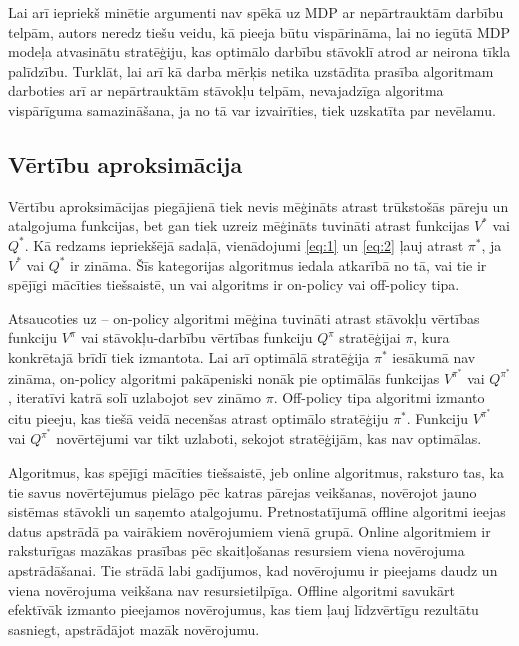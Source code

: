 \documentclass{ludis} %
\begin{document}

Lai arī iepriekš minētie argumenti nav spēkā uz MDP ar nepārtrauktām darbību telpām, autors neredz tiešu veidu, kā pieeja būtu vispārināma, lai no iegūtā MDP modeļa atvasinātu stratēģiju, kas optimālo darbību stāvoklī atrod ar neirona tīkla palīdzību.
Turklāt, lai arī kā darba mērķis netika uzstādīta prasība algoritmam darboties arī ar nepārtrauktām stāvokļu telpām, nevajadzīga algoritma vispārīguma samazināšana, ja no tā var izvairīties, tiek uzskatīta par nevēlamu.

\subsection{Vērtību aproksimācija}
Vērtību aproksimācijas piegājienā tiek nevis mēģināts atrast trūkstošās pāreju un atalgojuma funkcijas, bet gan tiek uzreiz mēģināts tuvināti atrast funkcijas $V^*$ vai $Q^*$.
Kā redzams iepriekšējā sadaļā, vienādojumi \eqref{eq:1} un \eqref{eq:2} ļauj atrast $\pi^*$, ja $V^*$ vai $Q^*$ ir zināma.
Šīs kategorijas algoritmus iedala atkarībā no tā, vai tie ir spējīgi mācīties tiešsaistē, un vai algoritms ir on-policy vai off-policy tipa.

Atsaucoties uz \autocite{Hasselt2012} -- on-policy algoritmi mēģina tuvināti atrast stāvokļu vērtības funkciju $V^\pi$ vai stāvokļu-darbību vērtības funkciju $Q^\pi$ stratēģijai $\pi$, kura konkrētajā brīdī tiek izmantota.
Lai arī optimālā stratēģija $\pi^*$ iesākumā nav zināma, on-policy algoritmi pakāpeniski nonāk pie optimālās funkcijas $V^{\pi^*}$ vai $Q^{\pi^*}$, iteratīvi katrā solī uzlabojot sev zināmo $\pi$.
Off-policy tipa algoritmi izmanto citu pieeju, kas tiešā veidā necenšas atrast optimālo stratēģiju $\pi^*$.
Funkciju $V^{\pi^*}$ vai $Q^{\pi^*}$ novērtējumi var tikt uzlaboti, sekojot stratēģijām, kas nav optimālas.

Algoritmus, kas spējīgi mācīties tiešsaistē, jeb online algoritmus, raksturo tas, ka tie savus novērtējumus pielāgo pēc katras pārejas veikšanas, novērojot jauno sistēmas stāvokli un saņemto atalgojumu.
Pretnostatījumā offline algoritmi ieejas datus apstrādā pa vairākiem novērojumiem vienā grupā.
Online algoritmiem ir raksturīgas mazākas prasības pēc skaitļošanas resursiem viena novērojuma apstrādāšanai. Tie strādā labi gadījumos, kad novērojumu ir pieejams daudz un viena novērojuma veikšana nav resursietilpīga.
Offline algoritmi savukārt efektīvāk izmanto pieejamos novērojumus, kas tiem ļauj līdzvērtīgu rezultātu sasniegt, apstrādājot mazāk novērojumu.
\end{document}
